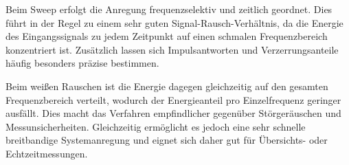 Beim Sweep erfolgt die Anregung frequenzselektiv und zeitlich geordnet. Dies führt in der Regel zu einem sehr guten Signal-Rausch-Verhältnis, da die Energie des Eingangssignals zu jedem Zeitpunkt auf einen schmalen Frequenzbereich konzentriert ist. Zusätzlich lassen sich Impulsantworten und Verzerrungsanteile häufig besonders präzise bestimmen.

Beim weißen Rauschen ist die Energie dagegen gleichzeitig auf den gesamten Frequenzbereich verteilt, wodurch der Energieanteil pro Einzelfrequenz geringer ausfällt. Dies macht das Verfahren empfindlicher gegenüber Störgeräuschen und Messunsicherheiten. Gleichzeitig ermöglicht es jedoch eine sehr schnelle breitbandige Systemanregung und eignet sich daher gut für Übersichts- oder Echtzeitmessungen.


\newpage
